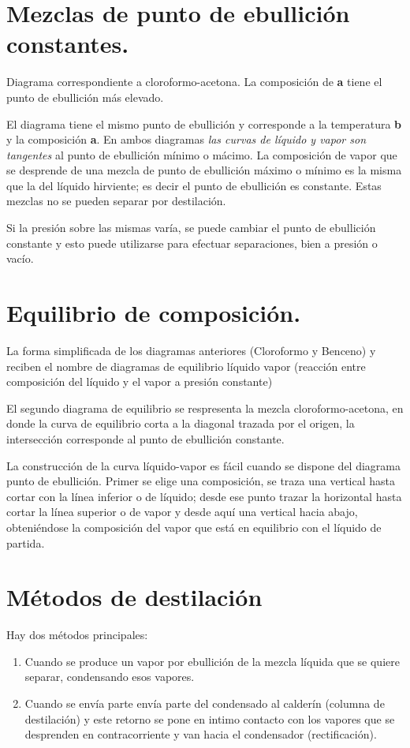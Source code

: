 \documentclass[11pt,openany]{book}
\begin{document}
\section{Mezclas de punto de ebullición constantes.}

Diagrama correspondiente a cloroformo-acetona. La composición de \textbf{a} tiene el punto de ebullición más elevado.

El diagrama tiene el mismo punto de ebullición y corresponde a la temperatura \textbf{b} y la composición \textbf{a}.
En ambos diagramas \textit{las curvas de líquido y vapor son tangentes} al punto de ebullición mínimo o mácimo.
La composición de vapor que se desprende de una mezcla de punto de ebullición máximo o mínimo es la misma que la del líquido
hirviente; es decir el punto de ebullición es constante.
Estas mezclas no se pueden separar por destilación.

Si la presión sobre las mismas varía, se puede cambiar el punto de ebullición constante y esto puede utilizarse para 
efectuar separaciones, bien a presión o vacío.

\section{Equilibrio de composición.}

La forma simplificada de los diagramas anteriores (Cloroformo y Benceno) y reciben el nombre de diagramas de equilibrio 
líquido vapor (reacción entre composición del líquido y el vapor a presión constante)

El segundo diagrama de equilibrio se respresenta la mezcla cloroformo-acetona, en donde la curva de equilibrio corta a la 
diagonal trazada por el origen, la intersección corresponde al punto de ebullición constante.

La construcción de la curva líquido-vapor es fácil cuando se dispone del diagrama punto de
 ebullición. Primer se elige una composición, se traza una vertical hasta 
 cortar con la línea inferior o de líquido; desde ese punto trazar la horizontal hasta cortar la línea 
 superior o de vapor y desde aquí una vertical hacia abajo, obteniéndose la composición del vapor 
 que está en equilibrio con el líquido de partida.

 \section{Métodos de destilación}

 Hay dos métodos principales:
 \begin{enumerate}
 \item Cuando se produce un vapor por ebullición de la mezcla líquida que se quiere separar, condensando esos vapores.
 \item Cuando se envía parte envía parte del condensado al calderín (columna de destilación) y este retorno 
 se pone en intimo contacto con los vapores que se desprenden en contracorriente y van hacia el condensador (rectificación).
 \end{enumerate}
\end{document}
